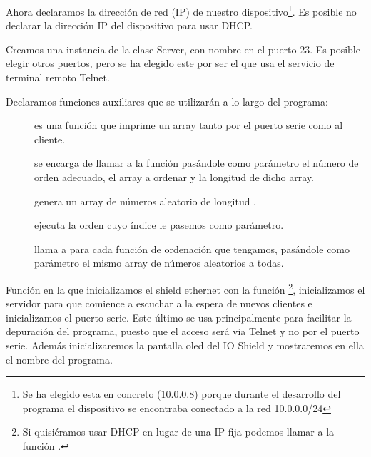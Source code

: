 
Ahora declaramos la dirección de red (IP) de nuestro dispositivo\protect\footnote{Se ha elegido esta en concreto (10.0.0.8) porque durante el desarrollo del programa el dispositivo se encontraba conectado a la red 10.0.0.0/24}. Es posible no declarar la dirección IP del dispositivo para usar DHCP\@.


Creamos una instancia de la clase Server, con nombre  en el puerto 23. Es posible elegir otros puertos, pero se ha elegido este por ser el que usa el servicio de terminal remoto Telnet.


Declaramos funciones auxiliares que se utilizarán a lo largo del programa:
\begin{description}
	\item[] es una función que imprime un array tanto por el puerto serie como al cliente.
	\item[] se encarga de llamar a la función  pasándole como parámetro el número de orden adecuado, el array a ordenar y la longitud de dicho array.
	\item[] genera un array de números aleatorio de longitud .
	\item[] ejecuta la orden cuyo índice le pasemos como parámetro.
	\item[] llama a  para cada función de ordenación que tengamos, pasándole como parámetro el mismo array de números aleatorios a todas.
\end{description}


Función  en la que inicializamos el shield ethernet con la función \protect\footnote{Si quisiéramos usar DHCP en lugar de una IP fija podemos llamar a la función .}, inicializamos el servidor para que comience a escuchar a la espera de nuevos clientes e inicializamos el puerto serie. Este último se usa principalmente para facilitar la depuración del programa, puesto que el acceso será via Telnet y no por el puerto serie. Además inicializaremos la pantalla oled del IO Shield y mostraremos en ella el nombre del programa.

